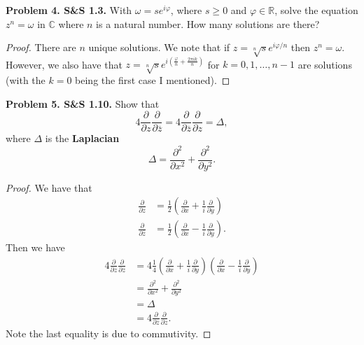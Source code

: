 \documentclass[leqno]{article}
\theoremstyle{nonumberplain}
\newtheorem{proof}{Proof}
\newcommand{\R}{\mathbb{R}}
\newcommand{\C}{\mathbb{C}}
\begin{document}
\vspace*{1cm}

\noindent\textbf{Problem 4. S\&S 1.3.} With $\omega = se^{i\varphi}$, where $s\geq 0$ and $\varphi \in \R$, solve the equation $z^n = \omega$ in $\C$ where $n$ is a natural number. How many solutions are there?


\begin{proof}
There are $n$ unique solutions.  We note that if $z=\sqrt[n]{s} e^{i\varphi/n}$ then $z^n=\omega$.  However, we also have that $z=\sqrt[n]{s}e^{i\left( \frac{\varphi}{n}+\frac{2\pi i k}{n} \right)}$ for $k=0,1,\dots,n-1$ are solutions (with the $k=0$ being the first case I mentioned). 
\end{proof}


\vspace*{1cm}

\noindent\textbf{Problem 5. S\&S 1.10.} Show that
\[
4 \frac{\partial}{\partial z} \frac{\partial}{\partial \overline{z}} = 4 \frac{\partial}{\partial \overline{z}} \frac{\partial}{\partial z} = \Delta,
\]
where $\Delta$ is the \textbf{Laplacian}
\[
\Delta = \frac{\partial^2}{\partial x^2}+\frac{\partial^2}{\partial y^2}.
\]

\begin{proof}
We have that 
\begin{align*}
\frac{\partial}{\partial z} &= \frac{1}{2} \left( \frac{\partial}{\partial x} + \frac{1}{i} \frac{\partial}{\partial y} \right)\\
\frac{\partial}{\partial \overline{z}} &= \frac{1}{2} \left( \frac{\partial}{\partial x} - \frac{1}{i} \frac{\partial}{\partial y} \right).
\end{align*}
Then we have
\begin{align*}
4 \frac{\partial}{\partial z} \frac{\partial}{\partial \overline{z}} &= 4 \frac{1}{4} \left(\frac{\partial}{\partial x} + \frac{1}{i} \frac{\partial}{\partial y} \right)\left( \frac{\partial}{\partial x} - \frac{1}{i} \frac{\partial}{\partial y} \right)\\
&= \frac{\partial^2}{\partial x^2}+\frac{\partial^2}{\partial y^2}\\
&= \Delta\\
&= 4 \frac{\partial}{\partial \overline{z}} \frac{\partial}{\partial z}.
\end{align*}
Note the last equality is due to commutivity.  
\end{proof}

\vspace*{1cm}
\end{document}
